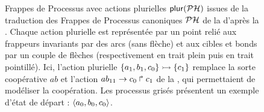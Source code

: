 \begin{figure}
  \centering
  \caption{%
    Frappes de Processus avec actions plurielles $\mathsf{plur}(\mathcal{PH})$ issues de la traduction
    des Frappes de Processus canoniques $\mathcal{PH}$ de la 
    d'après la .
    Chaque action plurielle est représentée par un point relié aux frappeurs invariants
    par des arcs (sans flèche) et aux cibles et bonds par un couple de flèches
    (respectivement en trait plein puis en trait pointillé).
    Ici, l'action plurielle $\mbox{$\{a_1, b_1, c_0\} \rightarrowtail \{c_1\}$}$
    remplace la sorte coopérative $ab$
    et l'action $ab_{11}\rightarrow c_0\Rsh c_1$ de la ,
    qui permettaient de modéliser la coopération.
    Les processus grisés présentent un exemple d'état de départ :
    $\mbox{$\langle a_0, b_0, c_0 \rangle$}$.
  }
\end{figure}

